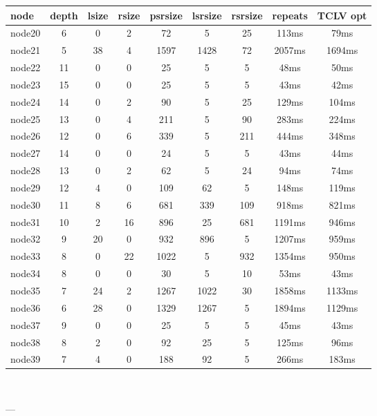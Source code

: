 \begin{tabular}{|l|c|c|c|c|c|c|c|c|}
\hline node & depth & lsize & rsize & psrsize & lsrsize & rsrsize   & repeats & TCLV opt\\
    \hline node20 & 6 & 0 & 2 & 72 & 5 & 25 & 113ms & 79ms\\
    \hline node21 & 5 & 38 & 4 & 1597 & 1428 & 72 & 2057ms & 1694ms\\
    \hline node22 & 11 & 0 & 0 & 25 & 5 & 5 & 48ms & 50ms\\
    \hline node23 & 15 & 0 & 0 & 25 & 5 & 5 & 43ms & 42ms\\
    \hline node24 & 14 & 0 & 2 & 90 & 5 & 25 & 129ms & 104ms\\
    \hline node25 & 13 & 0 & 4 & 211 & 5 & 90 & 283ms & 224ms\\
    \hline node26 & 12 & 0 & 6 & 339 & 5 & 211 & 444ms & 348ms\\
    \hline node27 & 14 & 0 & 0 & 24 & 5 & 5 & 43ms & 44ms\\
    \hline node28 & 13 & 0 & 2 & 62 & 5 & 24 & 94ms & 74ms\\
    \hline node29 & 12 & 4 & 0 & 109 & 62 & 5 & 148ms & 119ms\\
    \hline node30 & 11 & 8 & 6 & 681 & 339 & 109 & 918ms & 821ms\\
    \hline node31 & 10 & 2 & 16 & 896 & 25 & 681 & 1191ms & 946ms\\
    \hline node32 & 9 & 20 & 0 & 932 & 896 & 5 & 1207ms & 959ms\\
    \hline node33 & 8 & 0 & 22 & 1022 & 5 & 932 & 1354ms & 950ms\\
    \hline node34 & 8 & 0 & 0 & 30 & 5 & 10 & 53ms & 43ms\\
    \hline node35 & 7 & 24 & 2 & 1267 & 1022 & 30 & 1858ms & 1133ms\\
    \hline node36 & 6 & 28 & 0 & 1329 & 1267 & 5 & 1894ms & 1129ms\\
    \hline node37 & 9 & 0 & 0 & 25 & 5 & 5 & 45ms & 43ms\\
    \hline node38 & 8 & 2 & 0 & 92 & 25 & 5 & 125ms & 96ms\\
    \hline node39 & 7 & 4 & 0 & 188 & 92 & 5 & 266ms & 183ms\\

\hline
\end{tabular} \

---


